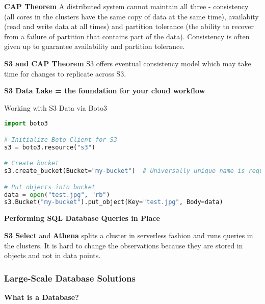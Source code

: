 \documentclass{article}
\begin{document}
\textbf{CAP Theorem} A distributed system cannot maintain all three - consistency (all cores in the clusters have the same copy of data at the same time), availabity (read and write data at all times) and partition tolerance (the ability to recover from a failure of partition that contains part of the data). Consistency is often given up to guarantee availability and partition tolerance.

\textbf{S3 and CAP Theorem} S3 offers eventual consistency model which may take time for changes to replicate across S3.

\textbf{S3 Data Lake = the foundation for your cloud workflow}

Working with S3 Data via Boto3

\begin{lstlisting}[language=Python]
import boto3

# Initialize Boto Client for S3
s3 = boto3.resource("s3")

# Create bucket
s3.create_bucket(Bucket="my-bucket")  # Universally unique name is requied

# Put objects into bucket
data = open("test.jpg", "rb")
s3.Bucket("my-bucket").put_object(Key="test.jpg", Body=data)
\end{lstlisting}

\textbf{Performing SQL Database Queries in Place}

\textbf{S3 Select} and \textbf{Athena} splits a cluster in serverless fashion and runs queries in the clusters. It is hard to change the observations because they are stored in objects and not in data points.

\subsubsection{Large-Scale Database Solutions}

\textbf{What is a Database?}
\end{document}
